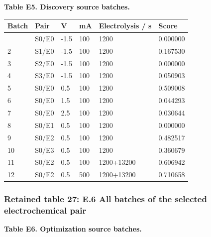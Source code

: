 \documentclass[10pt,a4paper]{article}
\begin{document}
\textbf{Table E5. Discovery source batches.}

{\def\LTcaptype{table} %
\small\begin{longtable}[]{@{}llllll@{}}
\toprule\noalign{}
Batch & Pair & V & mA & Electrolysis / s & Score \\
\midrule\noalign{}
\endhead
\bottomrule\noalign{}
\endlastfoot
1 & S0/E0 & -1.5 & 100 & 1200 & 0.000000 \\
2 & S1/E0 & -1.5 & 100 & 1200 & 0.167530 \\
3 & S2/E0 & -1.5 & 100 & 1200 & 0.000000 \\
4 & S3/E0 & -1.5 & 100 & 1200 & 0.050903 \\
5 & S0/E0 & 0.5 & 100 & 1200 & 0.509008 \\
6 & S0/E0 & 1.5 & 100 & 1200 & 0.044293 \\
7 & S0/E0 & 2.5 & 100 & 1200 & 0.030644 \\
8 & S0/E1 & 0.5 & 100 & 1200 & 0.000000 \\
9 & S0/E2 & 0.5 & 100 & 1200 & 0.482517 \\
10 & S0/E3 & 0.5 & 100 & 1200 & 0.360679 \\
11 & S0/E2 & 0.5 & 100 & 1200+13200 & 0.606942 \\
12 & S0/E2 & 0.5 & 500 & 1200+13200 & 0.710658 \\
\end{longtable}\normalsize
}

\subsubsection{Retained table 27: E.6 All batches of the selected electrochemical pair}\label{retained-table-27-e.6-all-batches-of-the-selected-electrochemical-pair}

\textbf{Table E6. Optimization source batches.}
\end{document}
